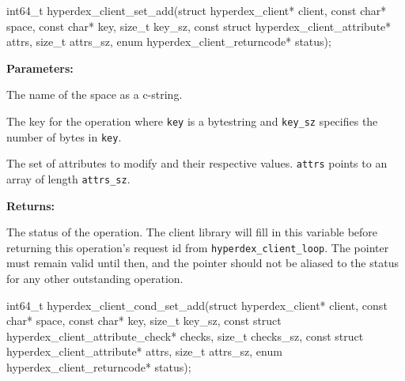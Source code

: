 \funcsep
{}
\begin{ccode}
int64_t hyperdex_client_set_add(struct hyperdex_client* client,
                const char* space,
                const char* key, size_t key_sz,
                const struct hyperdex_client_attribute* attrs, size_t attrs_sz,
                enum hyperdex_client_returncode* status);
\end{ccode}
\funcdesc 

\noindent\textbf{Parameters:}
\begin{description}[labelindent=\widthof{{\texttt{attrs}, \texttt{attrs\_sz}}},leftmargin=*,noitemsep,nolistsep,align=right]
\item[\texttt{space}] The name of the space as a c-string.
\item[\texttt{key}, \texttt{key\_sz}] The key for the operation where \texttt{key} is a bytestring and \texttt{key\_sz} specifies the number of bytes in \texttt{key}.
\item[\texttt{attrs}, \texttt{attrs\_sz}] The set of attributes to modify and their respective values.  \texttt{attrs} points to an array of length \texttt{attrs\_sz}.
\end{description}

\noindent\textbf{Returns:}
\begin{description}[labelindent=\widthof{{\texttt{status}}},leftmargin=*,noitemsep,nolistsep,align=right]
\item[\texttt{status}] The status of the operation.  The client library will fill in this variable before returning this operation's request id from \texttt{hyperdex\_client\_loop}.  The pointer must remain valid until then, and the pointer should not be aliased to the status for any other outstanding operation.
\end{description}

\funcsep
{}
\begin{ccode}
int64_t hyperdex_client_cond_set_add(struct hyperdex_client* client,
                const char* space,
                const char* key, size_t key_sz,
                const struct hyperdex_client_attribute_check* checks, size_t checks_sz,
                const struct hyperdex_client_attribute* attrs, size_t attrs_sz,
                enum hyperdex_client_returncode* status);
\end{ccode}
\funcdesc 

